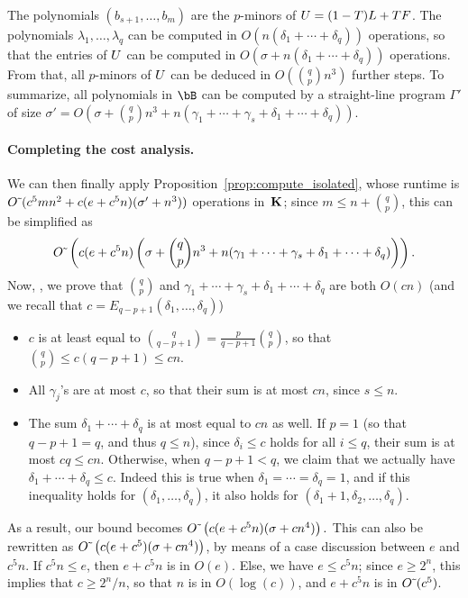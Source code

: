 \documentclass[12pt]{article}
\begin{document}
The polynomials $(b_{s+1},\dots,b_m)$ are the $p$-minors of
${U}=(1-T){L}+T{F}$.  The polynomials $\lambda_1,\dots,\lambda_q$ can
be computed in $O(n (\delta_1+\cdots+\delta_q))$ operations, so that
the entries of ${U}$ can be computed in $O(\sigma +
n(\delta_1+\cdots+\delta_q))$ operations. From that, all $p$-minors of
${U}$ can be deduced in $O({q \choose p} n^3)$ further steps.  To
summarize, all polynomials in $\bB$ can be computed by a straight-line
program $\Gamma'$ of size $\sigma'=O(\sigma + {q \choose p} n^3 +n(\gamma_1+\cdots+\gamma_s+\delta_1+\cdots+\delta_q))$.

\paragraph{Completing the cost analysis.}
We can then finally apply Proposition~\ref{prop:compute_isolated},
whose runtime is ${O}{\,\tilde{ }\,}(c^5 m n^2 + c(e+c^5 n)(\sigma' + n^3))$ operations
in~$\mathbf{K}$; since $m \le n + {q \choose p}$, this can be simplified as
$${O}{\,\tilde{ }\,}\left (c(e+c^5 n)\left(\sigma + {q \choose p} n^3
+n(\gamma_1+\cdots+\gamma_s+\delta_1+\cdots+\delta_q)\right)\right).$$
Now, , we prove that $ {q \choose p}$ and
$\gamma_1+\cdots+\gamma_s+\delta_1+\cdots+\delta_q$ are both
$O(cn)$ (and we recall that $c=E_{q-p+1}(\delta_1,\dots,\delta_q)$)
\begin{itemize}
\item $c$ is at least equal to $ {q \choose {q-p+1}}= \frac p{q-p+1}{q
  \choose p}$, so that ${q \choose p} \le c(q-p+1) \le cn$.
\item All $\gamma_j$'s are at most $c$, so that their sum is at most
  $cn$, since $s \le n$.
\item The sum $\delta_1+\cdots+\delta_q$ is at most equal to $cn$ as
  well.  If $p=1$ (so that $q-p+1=q$, and thus $q \le n$), since
  $\delta_i \le c$ holds for all $i\le q$, their sum is at most $cq\le
  cn$. Otherwise, when $q-p+1 < q$, we claim that we actually have
  $\delta_1+\cdots+\delta_q \le c$. Indeed this is true when
  $\delta_1=\cdots=\delta_q=1$, and if this inequality holds for
  $(\delta_1,\dots,\delta_q)$, it also holds for
  $(\delta_1+1,\delta_2,\dots,\delta_q)$.
\end{itemize}
As a result, our bound becomes ${O}{\,\tilde{ }\,}\left (c(e+c^5 n)(\sigma +
cn^4)\right).$  This can also be rewritten as ${O}{\,\tilde{ }\,}\left
(c(e+c^5 )(\sigma + cn^4)\right)$, by means of a 
 case discussion between $e$ and $c^5 n$. If $c^5 n \le e$,
then $e+c^5 n$ is in $O(e)$. Else,
we have $e \le c^5 n$; since $e \ge 2^n$, this implies 
that $c \ge 2^n/n$, so that $n$ is in $O(\log(c))$, 
and $e+c^5 n$ is in ${O}{\,\tilde{ }\,}(c^5)$.
\end{document}
